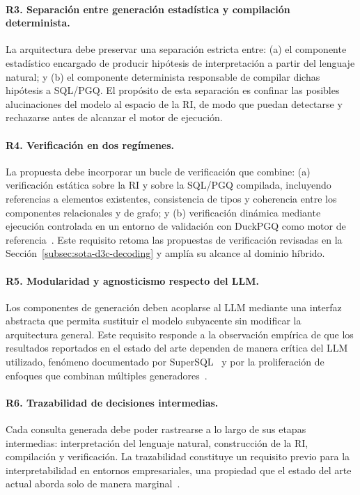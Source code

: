 \paragraph{R3. Separación entre generación estadística y compilación
determinista.} La arquitectura debe preservar una separación estricta entre:
(a) el componente estadístico encargado de producir hipótesis de interpretación
a partir del lenguaje natural; y (b) el componente determinista responsable de
compilar dichas hipótesis a \ac{SQL}/\ac{PGQ}. El propósito de esta separación
es confinar las posibles alucinaciones del modelo al espacio de la \ac{RI}, de
modo que puedan detectarse y rechazarse antes de alcanzar el motor de
ejecución.

\paragraph{R4. Verificación en dos regímenes.} La propuesta debe incorporar
un bucle de verificación que combine: (a) verificación estática sobre la
\ac{RI} y sobre la \ac{SQL}/\ac{PGQ} compilada, incluyendo referencias a
elementos existentes, consistencia de tipos y coherencia entre los componentes
relacionales y de grafo; y (b) verificación dinámica mediante ejecución
controlada en un entorno de validación con DuckPGQ como motor de
referencia~\cite{DuckPGQ}. Este requisito retoma las propuestas de
verificación revisadas en la Sección~\ref{subsec:sota-d3c-decoding} y amplía su
alcance al dominio híbrido.

\paragraph{R5. Modularidad y agnosticismo respecto del \ac{LLM}.} Los
componentes de generación deben acoplarse al \ac{LLM} mediante una interfaz
abstracta que permita sustituir el modelo subyacente sin modificar la
arquitectura general. Este requisito responde a la observación empírica de que %
los resultados reportados en el estado del arte dependen de manera crítica del
\ac{LLM} utilizado, fenómeno documentado por
SuperSQL~\cite{SuperSQL2024} y por la proliferación de enfoques que combinan
múltiples generadores~\cite{CHASE-SQL2025, XiYan-SQL2024}.

\paragraph{R6. Trazabilidad de decisiones intermedias.} Cada consulta
generada debe poder rastrearse a lo largo de sus etapas intermedias:
interpretación del lenguaje natural, construcción de la \ac{RI}, compilación y
verificación. La trazabilidad constituye un requisito previo para la %
interpretabilidad en entornos empresariales, una propiedad que el estado del
arte actual aborda solo de manera marginal~\cite{Data2Decisions, NLinterfaces}.

